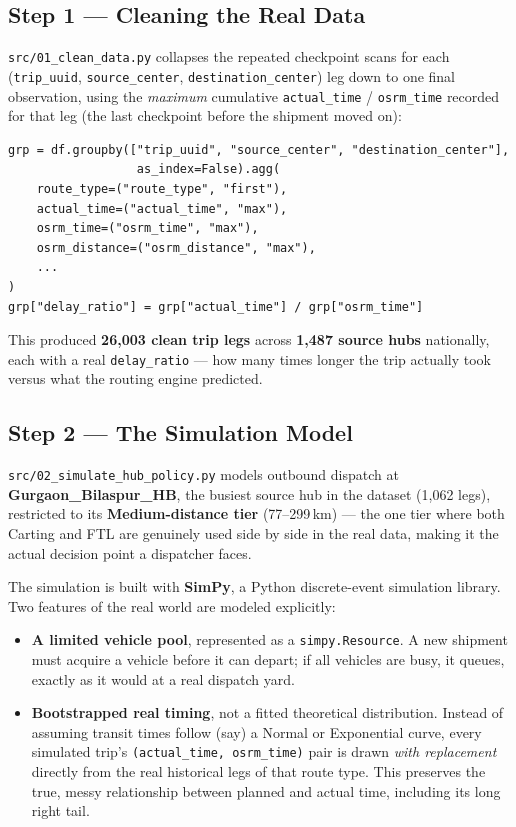 \documentclass[10.5pt,a4paper]{article}
\begin{document}
\subsection{Step 1 --- Cleaning the Real Data}

\texttt{src/01\_clean\_data.py} collapses the repeated checkpoint scans for each (\texttt{trip\_uuid}, \texttt{source\_center}, \texttt{destination\_center}) leg down to one final observation, using the \emph{maximum} cumulative \texttt{actual\_time} / \texttt{osrm\_time} recorded for that leg (the last checkpoint before the shipment moved on):

\begin{lstlisting}
grp = df.groupby(["trip_uuid", "source_center", "destination_center"],
                  as_index=False).agg(
    route_type=("route_type", "first"),
    actual_time=("actual_time", "max"),
    osrm_time=("osrm_time", "max"),
    osrm_distance=("osrm_distance", "max"),
    ...
)
grp["delay_ratio"] = grp["actual_time"] / grp["osrm_time"]
\end{lstlisting}

This produced \textbf{26,003 clean trip legs} across \textbf{1,487 source hubs} nationally, each with a real \texttt{delay\_ratio} --- how many times longer the trip actually took versus what the routing engine predicted.

\subsection{Step 2 --- The Simulation Model}

\texttt{src/02\_simulate\_hub\_policy.py} models outbound dispatch at \textbf{Gurgaon\_Bilaspur\_HB}, the busiest source hub in the dataset (1,062 legs), restricted to its \textbf{Medium-distance tier} (77--299\,km) --- the one tier where both Carting and FTL are genuinely used side by side in the real data, making it the actual decision point a dispatcher faces.

The simulation is built with \textbf{SimPy}, a Python discrete-event simulation library. Two features of the real world are modeled explicitly:

\begin{itemize}[leftmargin=1.4em]
  \item \textbf{A limited vehicle pool}, represented as a \texttt{simpy.Resource}. A new shipment must acquire a vehicle before it can depart; if all vehicles are busy, it queues, exactly as it would at a real dispatch yard.
  \item \textbf{Bootstrapped real timing}, not a fitted theoretical distribution. Instead of assuming transit times follow (say) a Normal or Exponential curve, every simulated trip's \texttt{(actual\_time, osrm\_time)} pair is drawn \emph{with replacement} directly from the real historical legs of that route type. This preserves the true, messy relationship between planned and actual time, including its long right tail.
\end{itemize}
\end{document}
